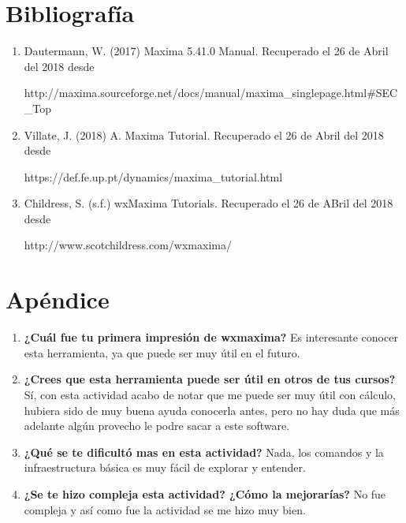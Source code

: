 \documentclass[a4paper]{article}
\begin{document}
\section{Bibliografía}
\begin{enumerate}
\item Dautermann, W. (2017) Maxima 5.41.0 Manual. Recuperado el 26 de Abril del 2018 desde 

http://maxima.sourceforge.net/docs/manual/maxima\_singlepage.html\#SEC\_Top
\item Villate, J. (2018) A. Maxima Tutorial. Recuperado el 26 de Abril del 2018 desde

https://def.fe.up.pt/dynamics/maxima\_tutorial.html
\item Childress, S. (s.f.) wxMaxima Tutorials. Recuperado el 26 de ABril del 2018 desde 

http://www.scotchildress.com/wxmaxima/
\end{enumerate}


\section{Apéndice}
\begin{enumerate}
\item \textbf{¿Cuál fue tu primera impresión de wxmaxima?}
Es interesante conocer esta herramienta, ya que puede ser muy útil en el futuro. 
\item \textbf{¿Crees que esta herramienta puede ser útil en otros de tus cursos?}
Sí, con esta actividad acabo de notar que me puede ser muy útil con cálculo, hubiera sido de muy buena ayuda conocerla antes, pero no hay duda que más adelante algún provecho le podre sacar a este software. 
\item \textbf{¿Qué se te dificultó mas en esta actividad?}
Nada, los comandos y la infraestructura básica es muy fácil de explorar y entender.
\item \textbf{¿Se te hizo compleja esta actividad? ¿Cómo la mejorarías?}
No fue compleja y así como fue la actividad se me hizo muy bien. 
\end{enumerate}
\end{document}
